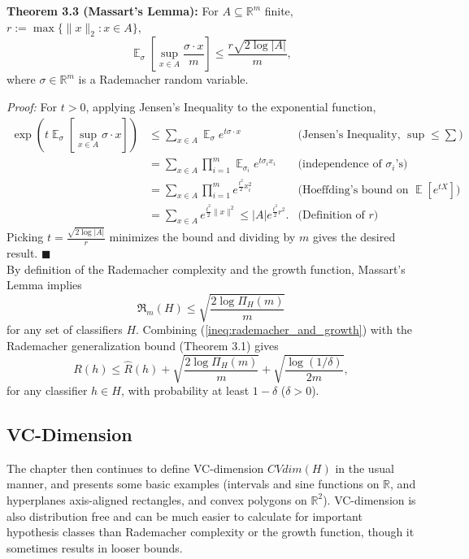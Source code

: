 \documentclass[10pt]{article}
\renewcommand{\qed}{\quad \ensuremath{\blacksquare}}    %
\newcommand{\R}{\mathbb{R}}                         %
\newcommand{\Rc}{\mathfrak{R}}                      %
\newcommand{\E}{\mathop{\mathbb{E}}}                %
\renewcommand{\hat}{\widehat}
\begin{document}
{\bf Theorem 3.3 (Massart's Lemma):} For $A \subseteq \R^m$ finite,
$r := \max \{\|x\|_2 : x \in A\}$,
\[\E_\sigma \left[ \sup_{x \in A} \frac{\sigma \cdot x}{m} \right]
    \leq \frac{r\sqrt{2 \log |A|}}{m},\]
where $\sigma \in \R^m$ is a Rademacher random variable.

\emph{Proof:} For $t > 0$, applying Jensen's Inequality to the exponential
function,
\begin{align*}
\exp\left( t \E_\sigma \left[ \sup_{x \in A} \sigma \cdot x \right] \right)
 &  \leq \sum_{x \in A} \E_\sigma e^{t \sigma \cdot x}
    & \mbox{(Jensen's Inequality, $\sup \leq \sum$)}    \\
 &  = \sum_{x \in A} \prod_{i = 1}^m \E_{\sigma_i} e^{t \sigma_i x_i}
    & \mbox{(independence of $\sigma_i$'s)}    \\
 &  = \sum_{x \in A} \prod_{i = 1}^m e^{\frac{t^2}{2}x_i^2}
    & \mbox{(Hoeffding's bound on $\E\left[ e^{tX} \right]$)}    \\
 &  = \sum_{x \in A} e^{\frac{t^2}{2} \|x\|^2}
    \leq |A| e^{\frac{t^2}{2} r^2}.
    & \mbox{(Definition of $r$)}
\end{align*}
Picking $t = \frac{\sqrt{2 \log |A|}}{r}$ minimizes the bound and dividing by
$m$ gives the desired result. \qed \\

By definition of the Rademacher complexity and the growth function, Massart's
Lemma implies
\begin{equation}
\Rc_m(H) \leq \sqrt{\frac{2 \log \Pi_H(m)}{m}}
\label{ineq:rademacher_and_growth}
\end{equation}
for any set of classifiers $H$. Combining (\ref{ineq:rademacher_and_growth})
with the Rademacher generalization bound (Theorem 3.1) gives
\begin{equation}
R(h) \leq \hat R(h) + \sqrt{\frac{2 \log \Pi_H(m)}{m}}
                    + \sqrt{\frac{\log (1/\delta)}{2m}},
\label{ineq:growth_gen_bound}
\end{equation}
for any classifier $h \in H$, with probability at least $1 - \delta$
($\delta > 0$).

\subsection{VC-Dimension}
The chapter then continues to define VC-dimension $CVdim(H)$ in the usual
manner, and presents some basic examples (intervals and sine functions on $\R$,
and hyperplanes axis-aligned rectangles, and convex polygons on $\R^2$).
VC-dimension is also distribution free and can be much easier to calculate for
important hypothesis classes than Rademacher complexity or the growth function,
though it sometimes results in looser bounds.
\end{document}
